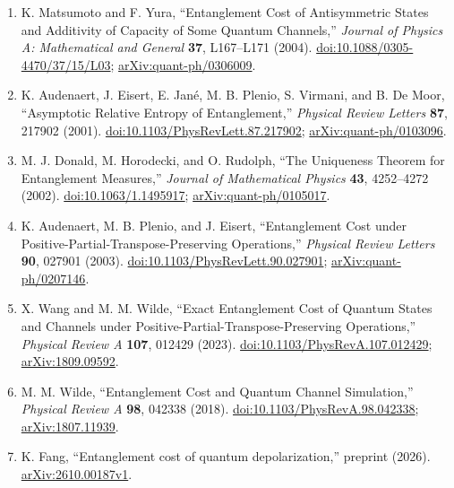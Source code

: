 \begin{enumerate}[label={},leftmargin=4.8em,labelsep=0.5em]
  \item[\textup{[MY04]}]\label{ref:0c23-matsumoto-yura}
  K. Matsumoto and F. Yura,
  ``Entanglement Cost of Antisymmetric States and Additivity of Capacity of
  Some Quantum Channels,''
  \emph{Journal of Physics A: Mathematical and General} \textbf{37},
  L167--L171 (2004).
  \href{https://doi.org/10.1088/0305-4470/37/15/L03}{doi:10.1088/0305-4470/37/15/L03};
  \href{https://arxiv.org/abs/quant-ph/0306009}{arXiv:quant-ph/0306009}.

  \item[\textup{[AEJ+01]}]\label{ref:0c23-audenaert-et-al}
  K. Audenaert, J. Eisert, E. Jan\'e, M. B. Plenio, S. Virmani, and
  B. De Moor,
  ``Asymptotic Relative Entropy of Entanglement,''
  \emph{Physical Review Letters} \textbf{87}, 217902 (2001).
  \href{https://doi.org/10.1103/PhysRevLett.87.217902}{doi:10.1103/PhysRevLett.87.217902};
  \href{https://arxiv.org/abs/quant-ph/0103096}{arXiv:quant-ph/0103096}.

  \item[\textup{[DHR02]}]\label{ref:0c23-donald-horodecki-rudolph}
  M. J. Donald, M. Horodecki, and O. Rudolph,
  ``The Uniqueness Theorem for Entanglement Measures,''
  \emph{Journal of Mathematical Physics} \textbf{43}, 4252--4272 (2002).
  \href{https://doi.org/10.1063/1.1495917}{doi:10.1063/1.1495917};
  \href{https://arxiv.org/abs/quant-ph/0105017}{arXiv:quant-ph/0105017}.

  \item[\textup{[APE03]}]\label{ref:0c23-audenaert-plenio-eisert}
  K. Audenaert, M. B. Plenio, and J. Eisert,
  ``Entanglement Cost under Positive-Partial-Transpose-Preserving Operations,''
  \emph{Physical Review Letters} \textbf{90}, 027901 (2003).
  \href{https://doi.org/10.1103/PhysRevLett.90.027901}{doi:10.1103/PhysRevLett.90.027901};
  \href{https://arxiv.org/abs/quant-ph/0207146}{arXiv:quant-ph/0207146}.

  \item[\textup{[WW23]}]\label{ref:0c23-wang-wilde}
  X. Wang and M. M. Wilde,
  ``Exact Entanglement Cost of Quantum States and Channels under
  Positive-Partial-Transpose-Preserving Operations,''
  \emph{Physical Review A} \textbf{107}, 012429 (2023).
  \href{https://doi.org/10.1103/PhysRevA.107.012429}{doi:10.1103/PhysRevA.107.012429};
  \href{https://arxiv.org/abs/1809.09592}{arXiv:1809.09592}.

  \item[\textup{[Wil18]}]\label{ref:0c23-wilde}
  M. M. Wilde,
  ``Entanglement Cost and Quantum Channel Simulation,''
  \emph{Physical Review A} \textbf{98}, 042338 (2018).
  \href{https://doi.org/10.1103/PhysRevA.98.042338}{doi:10.1103/PhysRevA.98.042338};
  \href{https://arxiv.org/abs/1807.11939}{arXiv:1807.11939}.

  \item[\textup{[Fan26]}]\label{ref:0c23-fang}
  K. Fang, ``Entanglement cost of quantum depolarization,''
  preprint (2026).
  \href{https://arxiv.org/abs/2610.00187v1}{arXiv:2610.00187v1}.
\end{enumerate}

